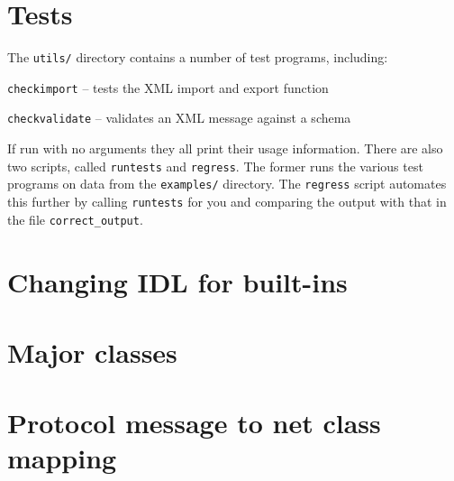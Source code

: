 \documentclass[12pt,a4paper,twoside]{article}
\renewcommand{\_}{\texttt{\symbol{95}}}
\begin{document}
\section{Tests}

The \verb^utils/^ directory contains a number of test programs,
including:
\begin{bulletlist}
\item \verb^checkimport^ -- tests the XML import and export function
\item \verb^checkvalidate^ -- validates an XML message against a schema
\end{bulletlist}
If run with no arguments they all print their usage information.
There are also two scripts, called \verb^runtests^ and \verb^regress^.
The former runs the various test programs on data from the
\verb^examples/^ directory. The \verb^regress^ script automates
this further by calling \verb^runtests^ for you and comparing the
output with that in the file \verb^correct_output^.

\section{Changing IDL for built-ins}

\section{Major classes}

\section{Protocol message to net class mapping}

% 
% 
% 
% 
\end{document}
